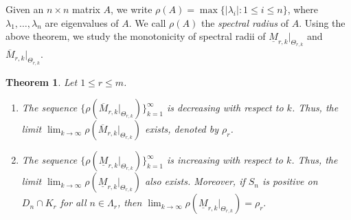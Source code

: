 \documentclass[11pt]{amsart}
\newtheorem{thm}{Theorem}[section]
\newtheorem{cor}[thm]{Corollary}
\theoremstyle{definition}
\theoremstyle{remark}
\numberwithin{equation}{section}
\newcommand{\red}{\color{red}}
\newcommand{\upM}{{\overline{M}}}
\newcommand{\lowM}{{\underline{M}}}
\newcommand{\uprho}{{{\rho}}}
\def\gl{\lambda}
\begin{document}




Given an $n\times n$ matrix $A$, we write
$\rho(A)=\max\{|\lambda_i|: 1 \leq i \leq n\}$, where $\lambda_1,\ldots,\lambda_n$ are eigenvalues of $A$.
We call $\rho(A)$ the \emph{spectral radius} of $A$.
Using the above theorem, we study the monotonicity of spectral radii of $\lowM_{r,k}|_{\Theta_{r,k}}$ and $\upM_{r,k}|_{\Theta_{r,k}}$. 
\begin{thm}\label{thm:rho-up-sub}
	Let $1\leq r\leq m$.
	\begin{enumerate}
		\item 	The sequence $\{\rho(\upM_{r,k}|_{\Theta_{r,k}})\}_{k=1}^\infty$ is decreasing with respect to $k$. Thus, the limit $\lim_{k \to \infty}\rho(\upM_{r,k}|_{\Theta_{r,k}})$ exists, denoted by $\uprho_{r}$.
		\item The sequence $\{\rho(\lowM_{r,k}|_{\Theta_{r,k}})\}_{k=1}^\infty$ is increasing with respect to $k$. Thus, the limit $\lim_{k \to \infty}\rho(\lowM_{r,k}|_{\Theta_{r,k}})$ also exists. Moreover, if $S_n$ is positive on $D_n \cap K_r$ for all $n\in \Lambda_r$, then
		$\lim_{k \to \infty}\rho(\lowM_{r,k}|_{\Theta_{r,k}})=\uprho_r.$		
	\end{enumerate}
\end{thm}


\end{document}
